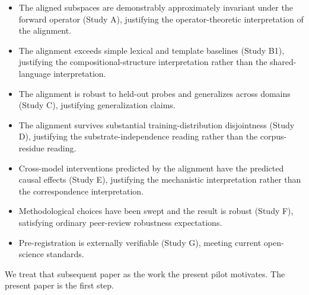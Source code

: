 \begin{itemize}
    \item The aligned subspaces are demonstrably approximately invariant
        under the forward operator (Study A), justifying the
        operator-theoretic interpretation of the alignment.
    \item The alignment exceeds simple lexical and template baselines
        (Study B1), justifying the compositional-structure interpretation
        rather than the shared-language interpretation.
    \item The alignment is robust to held-out probes and generalizes
        across domains (Study C), justifying generalization claims.
    \item The alignment survives substantial training-distribution
        disjointness (Study D), justifying the substrate-independence
        reading rather than the corpus-residue reading.
    \item Cross-model interventions predicted by the alignment have
        the predicted causal effects (Study E), justifying the
        mechanistic interpretation rather than the correspondence
        interpretation.
    \item Methodological choices have been swept and the result is
        robust (Study F), satisfying ordinary peer-review robustness
        expectations.
    \item Pre-registration is externally verifiable (Study G),
        meeting current open-science standards.
\end{itemize}

We treat that subsequent paper as the work the present pilot
motivates. The present paper is the first step.
